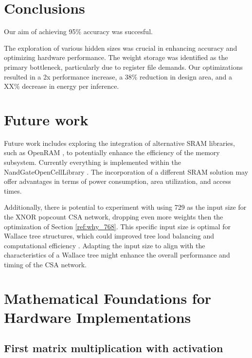 \documentclass[conference]{IEEEtran}
\newcounter{todocount}
\newcommand{\todo}[1]{
  \stepcounter{todocount}
}
\begin{document}
\section{Conclusions}
\label{sec:conclusions}

Our aim of achieving 95\% accuracy was succesful. 
\todo{this XX percent}
The exploration of various hidden sizes was crucial in enhancing accuracy and optimizing hardware performance. The weight storage was identified as the primary bottleneck, particularly due to register file demands. Our optimizations resulted in a 2x performance increase, a 38\% reduction in design area, and a XX\% decrease in energy per inference.


\section{Future work}
\label{sec:future}

Future work includes exploring the integration of alternative SRAM libraries, such as OpenRAM \cite{openram}, to potentially enhance the efficiency of the memory subsystem. Currently everything is implemented within the NandGateOpenCellLibrary \cite{nangate_lib}. The incorporation of a different SRAM solution may offer advantages in terms of power consumption, area utilization, and access times.

Additionally, there is potential to experiment with using 729 as the input size for the XNOR popcount CSA network, dropping even more weights then the optimization of Section \ref{ref:why_768}. This specific input size is optimal for Wallace tree structures, which could improved tree load balancing and computational efficiency \cite{wallace} . Adapting the input size to align with the characteristics of a Wallace tree might enhance the overall performance and timing of the CSA network.

\newpage

\printbibliography

\newpage
\clearpage

\appendix
\label{appendix}

\section{Mathematical Foundations for Hardware Implementations}

\label{appendix:bnn_maths}

\subsection{First matrix multiplication with activation}
\end{document}
